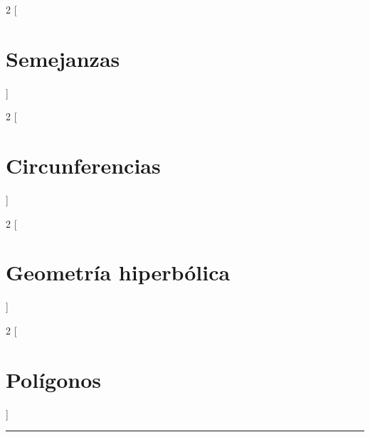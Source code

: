 \documentclass[a4paper, ]{article}
\begin{document}
	\begin{multicols*}{2}
	[\section{Semejanzas}]
	\end{multicols*}\pagebreak
	
	\begin{multicols*}{2}
	[\section{Circunferencias}]
	\end{multicols*}\pagebreak
	
	\begin{multicols*}{2}
	[\section{Geometría hiperbólica}]
	\end{multicols*}\pagebreak
	
	\begin{multicols*}{2}
	[\section{Polígonos}]
	\end{multicols*}\pagebreak
	
	 \noindent\rule{\linewidth}{0.4pt}
	 \doclicenseThis
	 
	 
	 
	 
	 
	 
	 
	 
	  	
 	
 	
 	
 	
 	
\end{document}

